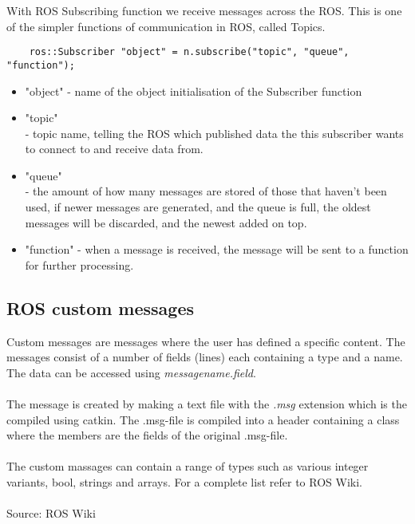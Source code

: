 \fi

With ROS Subscribing function we receive messages across the ROS. This is one of the simpler functions of communication in ROS, called Topics. %

\begin{lstlisting}
    ros::Subscriber "object" = n.subscribe("topic", "queue", "function");
\end{lstlisting}
\begin{itemize}
\setlength{\itemsep}{0.05\baselineskip}
    \item "object" - name of the object initialisation of the Subscriber function 
    \item "topic"\\- topic name, telling the ROS which published data the this subscriber wants to connect to and receive data from. 
    \item "queue"\\- the amount of how many messages are stored of those that haven't been used, if newer messages are generated, and the queue is full, the oldest messages will be discarded, and the newest added on top. 
    \item "function" - when a message is received, the message will be sent to a function for further processing.
\end{itemize}

\newpage

\subsection{ROS custom messages}
Custom messages are messages where the user has defined a specific content. The messages consist of a number of fields (lines) each containing a type and a name. The data can be accessed using \textit{messagename.field}.\\
\\
The message is created by making a text file with the \textit{.msg} extension which is the compiled using catkin. The .msg-file is compiled into a header containing a class where the members are the fields of the original .msg-file.\\
\\
The custom massages can contain a range of types such as various integer variants, bool, strings and arrays. For a complete list refer to ROS Wiki.\\
\\
Source: ROS Wiki\cite{ROS_msg}

